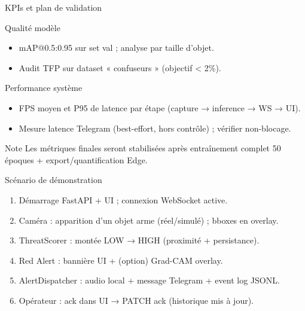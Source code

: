 \documentclass[aspectratio=169,11pt]{beamer}
\begin{document}
\begin{frame}{KPIs et plan de validation}
  \begin{block}{Qualité modèle}
    \begin{itemize}
      \item mAP@0.5:0.95 sur set val ; analyse par taille d'objet.
      \item Audit TFP sur dataset « confuseurs » (objectif < 2\%).
    \end{itemize}
  \end{block}

  \begin{block}{Performance système}
    \begin{itemize}
      \item FPS moyen et P95 de latence par étape (capture → inference → WS → UI).
      \item Mesure latence Telegram (best-effort, hors contrôle) ; vérifier non-blocage.
    \end{itemize}
  \end{block}

  \begin{alertblock}{Note}
    Les métriques finales seront stabilisées après entraînement complet 50 époques + export/quantification Edge.
  \end{alertblock}
\end{frame}

\begin{frame}{Scénario de démonstration}
  \begin{enumerate}
    \item Démarrage FastAPI + UI ; connexion WebSocket active.
    \item Caméra : apparition d'un objet arme (réel/simulé) ; bboxes en overlay.
    \item ThreatScorer : montée LOW → HIGH (proximité + persistance).
    \item Red Alert : bannière UI + (option) Grad-CAM overlay.
    \item AlertDispatcher : audio local + message Telegram + event log JSONL.
    \item Opérateur : ack dans UI → PATCH ack (historique mis à jour).
  \end{enumerate}
\end{frame}
\end{document}
